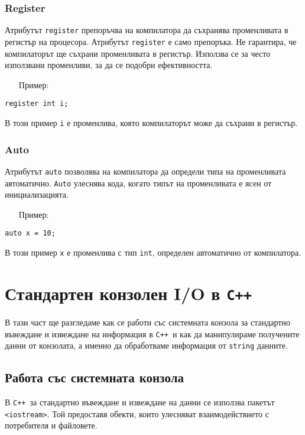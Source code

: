 \documentclass[oneside]{book}
\newcommand*{\code}[1]{\texttt{#1}}
\newcommand*{\cpp}{\texttt{C++}\ }
\begin{document}
\subsubsection{Register}
Атрибутът \code{register} препоръчва на компилатора да съхранява променливата в регистър на процесора. Атрибутът \code{register} е само препоръка. Не гарантира, че компилаторът ще съхрани променливата в регистър. Използва се за често използвани променливи, за да се подобри ефективността.
\pagebreak
\begin{itemize}
    \item[Пример:]
\end{itemize} 
\begin{mdframed}\begin{lstlisting}
register int i;
\end{lstlisting}\end{mdframed}
В този пример \code{i} е променлива, която компилаторът може да съхрани в регистър.

\subsubsection{Auto}
Атрибутът \code{auto} позволява на компилатора да определи типа на променливата автоматично. \code{Auto} улеснява кода, когато типът на променливата е ясен от инициализацията.

\begin{itemize}
    \item[Пример:]
\end{itemize} 
\begin{mdframed}\begin{lstlisting}
auto x = 10;
\end{lstlisting}\end{mdframed}
В този пример \code{x} е променлива с тип \code{int}, определен автоматично от компилатора.

\section{Стандартен конзолен I/O в \cpp}
В тази част ще разгледаме как се работи със системната конзола за стандартно въвеждане и извеждане на информация в \cpp и как да манипулираме получените данни от конзолата, а именно да обработваме информация от \code{string} данните.
\subsection{Работа със системната конзола}
В \cpp за стандартно въвеждане и извеждане на данни се използва пакетът \code{<iostream>}. Той предоставя обекти, които улесняват взаимодействието с потребителя и файловете.
\end{document}
